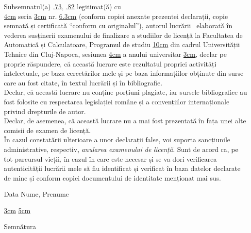 \begin{minipage}{\linewidth}
	Subsemnatul(a) \uline{.73\linewidth},
	\uline{.82\linewidth}
	legitimat(ă) cu\\ \uline{4cm} seria \uline{3cm} nr. \uline{6.3cm}
	(conform copiei anexate prezentei declarații, copie semnată și certificată ``conform cu originalul''), autorul lucrării\
	\uline{\linewidth}
	\uline{\linewidth}
	\uline{\linewidth}
	elaborată în vederea susținerii examenului de finalizare a studiilor de licență la Facultatea de Automatică și Calculatoare, Programul de studiu \uline{10cm} din cadrul Universității Tehnice din Cluj-Napoca, sesiunea \uline{4cm} a anului universitar \uline{3cm}, declar pe proprie răspundere, că această lucrare este rezultatul propriei activități intelectuale, pe baza cercetărilor mele și pe baza informațiilor obținute din surse care au fost citate, în textul lucrării și în bibliografie.\\
	Declar, că această lucrare nu conține porțiuni plagiate, iar sursele bibliografice au fost folosite cu respectarea legislației române și a convențiilor internaționale privind drepturile de autor.\\
	Declar, de asemenea, că această lucrare nu a mai fost prezentată în fața unei alte comisii de examen de licență.\\
	În cazul constatării ulterioare a unor declarații false, voi suporta sancțiunile administrative, respectiv, \emph{anularea examenului de licență}. Sunt de acord ca, pe tot parcursul vieții, în cazul în care este necesar și se va dori verificarea autenticității lucrării mele să fiu identificat și verificat în baza datelor declarate de mine și conform copiei documentului de identitate menționat mai sus.
\end{minipage}
\vspace{1.5cm}

Data \hspace{8cm} Nume, Prenume

\vspace{0.5cm}

\uline{3cm} \hspace{5cm} \uline{5cm}

\vspace{1cm}
\hspace{9.4cm}Semnătura
\newpage
